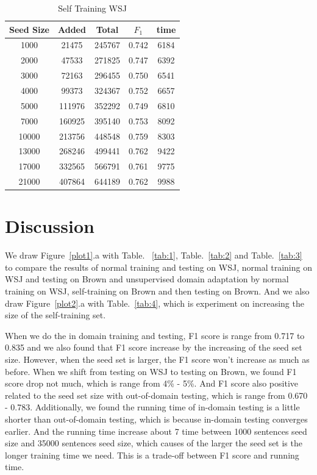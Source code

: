 \documentclass[journal, a4paper]{IEEEtran}
\begin{document}
			\begin{table}[!hbt]
		\begin{center}
		\caption{Self Training WSJ}
		\label{tab:8}
		\begin{tabular}{|c|c|c|c|c|}
			\hline
			Seed Size & Added & Total & $F_{1}$ & time\\ \hline
			  1000  & 21475 & 245767 & 0.742 & 6184\\ \hline
			  2000  & 47533 & 271825 & 0.747 & 6392\\ \hline
			  3000  & 72163 & 296455 & 0.750 & 6541\\ \hline
			  4000  & 99373 & 324367 & 0.752 & 6657\\ \hline
			  5000  & 111976 & 352292 & 0.749 & 6810\\ \hline
			  7000  & 160925 & 395140 & 0.753 & 8092\\ \hline
			  10000  & 213756 & 448548 & 0.759 & 8303\\ \hline
			  13000  & 268246 & 499441 & 0.762 & 9422\\ \hline
			  17000  & 332565 & 566791 & 0.761 & 9775\\ \hline
			  21000  & 407864 & 644189 & 0.762 & 9988\\
			 \hline
		\end{tabular}
		\end{center}
		\vspace{-5mm}
	\end{table}
	
	
\section{Discussion}\label{discuss}
We draw Figure~\ref{plot1}.a with Table. ~\ref{tab:1}, Table.~\ref{tab:2} and Table.~\ref{tab:3} to compare the results of normal training and testing on WSJ, normal training on WSJ and testing on Brown and unsupervised domain adaptation by normal training on WSJ, self-training on Brown and then testing on Brown. And we also draw Figure~\ref{plot2}.a with Table.~\ref{tab:4}, which is experiment on increasing the size of the self-training set.

When we do the in domain training and testing, F1 score is range from 0.717 to 0.835 and we also found that F1 score increase by the increasing of the seed set size. However, when the seed set is larger, the F1 score won't increase as much as before. When we shift from testing on WSJ to testing on Brown, we found F1 score drop not much, which is range from 4\% - 5\%. And F1 score also positive related to the seed set size with out-of-domain testing, which is range from 0.670 - 0.783. Additionally, we found the running time of in-domain testing is a little shorter than out-of-domain testing, which is because in-domain testing converges earlier. And the running time increase about 7 time between 1000 sentences seed size and 35000 sentences seed size, which causes of the larger the seed set is the longer training time we need. This is a trade-off between F1 score and running time.
\end{document}
